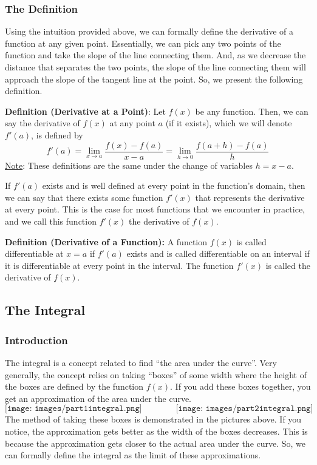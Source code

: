 \subsubsection{The Definition}
Using the intuition provided above, we can formally define the derivative of a function at any given point. Essentially, we can pick any two points of the function and take the slope of the line connecting them. And, as we decrease the distance that separates the two points, the slope of the line connecting them will approach the slope of the tangent line at the point. So, we present the following definition.
\begin{boxedsection}
\textbf{Definition (Derivative at a Point)}: Let $f(x)$ be any function. Then, we can say the derivative of $f(x)$ at any point $a$ (if it exists), which we will denote $f'(a)$, is defined by
$$
f'(a) = \lim_{x \rightarrow a} \frac{f(x) - f(a)}{x-a} = \lim_{h \rightarrow 0} \frac{f(a+h) - f(a)}{h}
$$
\underline{Note}: These definitions are the same under the change of variables $h = x -a$. 
\end{boxedsection}
If $f'(a)$ exists and is well defined at every point in the function's domain, then we can say that there exists some function $f'(x)$ that represents the derivative at every point. This is the case for most functions that we encounter in practice, and we call this function $f'(x)$ the derivative of $f(x)$.
\begin{boxedsection}
\textbf{Definition (Derivative of a Function):} A function $f(x)$ is called differentiable at $x=a$ if $f'(a)$ exists and is called differentiable on an interval if it is differentiable at every point in the interval. The function $f'(x)$ is called the derivative of $f(x)$.
\end{boxedsection}
\subsection{The Integral}
\subsubsection{Introduction}
The integral is a concept related to find ``the area under the curve''. Very generally, the concept relies on taking ``boxes'' of some width where the height of the boxes are defined by the function $f(x)$. If you add these boxes together, you get an approximation of the area under the curve.
$$
\texttt{[image: images/part1integral.png]} \quad \quad \quad \quad
\texttt{[image: images/part2integral.png]}
$$
The method of taking these boxes is demonstrated in the pictures above. If you notice, the approximation gets better as the width of the boxes decreases. This is because the approximation gets closer to the actual area under the curve. So, we can formally define the integral as the limit of these approximations.
